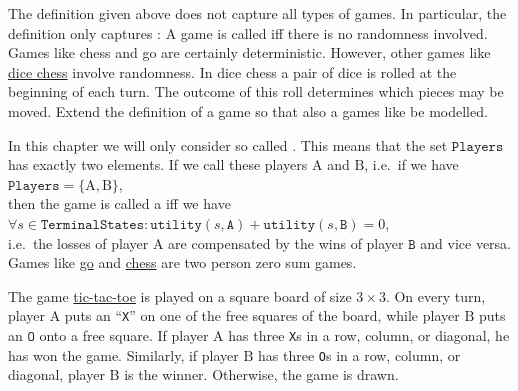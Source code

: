\exercise
The definition given above does not capture all types of games.  In particular, the definition only captures 
:  A game is called  iff there is no randomness
involved.  Games like chess and go are certainly deterministic.  However, other games like 
\href{https://en.wikipedia.org/wiki/Dice_chess}{dice chess} involve randomness.  In dice chess a pair of dice is
rolled at the beginning of each turn.  The outcome of this roll determines which pieces may be moved.
Extend the definition of a
game so that also a games like  be modelled.  
\eox

In this chapter we will only consider so called .  This means that the set $\mathtt{Players}$
has exactly two elements.  If we call these players $\mathrm{A}$ and $\mathrm{B}$, i.e.~if we have
\\[0.2cm]
\hspace*{1.3cm}
$\mathtt{Players} = \{ \mathrm{A}, \mathrm{B} \}$,
\\[0.2cm]
then the game is called a  iff we have
\\[0.2cm]
\hspace*{1.3cm}
$\forall s \in \mathtt{TerminalStates}:\mathtt{utility}(s, \mathtt{A}) + \mathtt{utility}(s, \mathtt{B}) = 0$,
\\[0.2cm]
i.e.~the losses of player $\mathrm{A}$ are compensated by the wins of player $\mathtt{B}$ and vice versa.
Games like \href{https://en.wikipedia.org/wiki/Go_(game)}{go} and 
\href{https://en.wikipedia.org/wiki/Chess}{chess} are two person zero sum games.

\example
The game \href{https://en.wikipedia.org/wiki/Tic-tac-toe}{tic-tac-toe} is played on a square board of size 
$3 \times 3$.  On every turn, player $\mathrm{A}$ puts an ``\texttt{X}'' on one of the free squares of the board, while
player $\mathrm{B}$ puts an $\mathtt{O}$ onto a free square.  If player $\mathrm{A}$ has three \texttt{X}s in a
row, column, or diagonal, he has won the game.  Similarly, if player $\mathrm{B}$ has three \texttt{O}s in a
row, column, or diagonal, player $\mathrm{B}$ is the winner.  Otherwise, the game is drawn.

